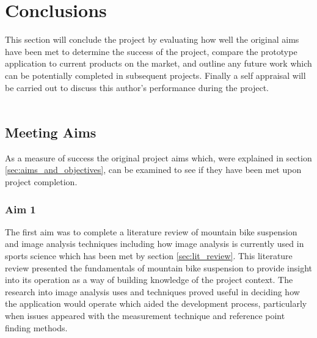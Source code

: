 \section{Conclusions}\label{sec:conclusion}
	This section will conclude the project by evaluating how well the original aims have been met to determine the success of the project, compare the prototype application to current products on the market, and outline any future work which can be potentially completed in subsequent projects. Finally a self appraisal will be carried out to discuss this author's performance during the project.
	\\\\
		
	\subsection{Meeting Aims}
		As a measure of success the original project aims which, were explained in section \ref{sec:aims_and_objectives}, can be examined to see if they have been met upon project completion. 
		\subsubsection{Aim 1}
			The first aim was to complete a literature review of mountain bike suspension and image analysis techniques including how image analysis is currently used in sports science which has been met by section \ref{sec:lit_review}. This literature review presented the fundamentals of mountain bike suspension to provide insight into its operation as a way of building knowledge of the project context. The research into image analysis uses and techniques proved useful in deciding how the application would operate which aided the development process, particularly when issues appeared with the measurement technique and reference point finding methods.
